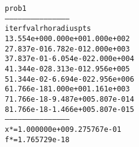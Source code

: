 \begin{alltt}
prob1
---------------------------------------------
iter        fval         rho      radius  pts
   1   3.554e+00   0.000e+00   1.000e+00    2
   2   7.837e-01   6.782e-01   2.000e+00    3
   3   7.837e-01  -6.054e-02   2.000e+00    4
   4   1.344e-02   8.313e-01   2.956e+00    5
   5   1.344e-02  -6.694e-02   2.956e+00    6
   6   1.766e-18   1.000e+00   1.161e+00    3
   7   1.766e-18  -9.487e+00   5.807e-01    4
   8   1.766e-18  -1.466e+00   5.807e-01    5
---------------------------------------------
x* = 1.000000e+00  9.275767e-01  
f* = 1.765729e-18
\end{alltt}
